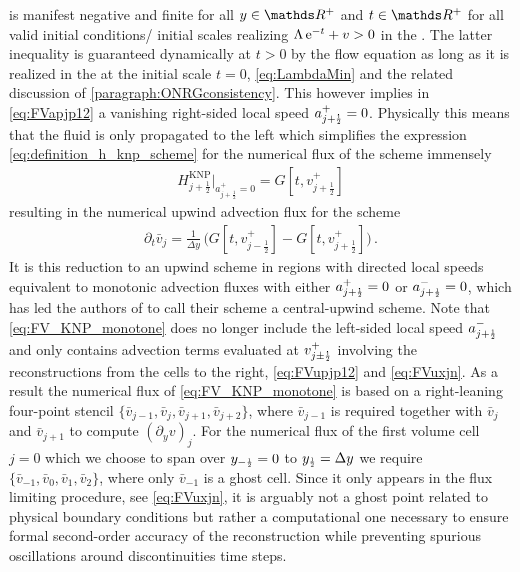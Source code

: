 is manifest negative and finite for all $y\in\Reals{}^+$ and $t\in\Reals{}^+$ for all valid initial conditions/\uv{} initial scales realizing $\Lambda \, \mathrm{e}^{-t} + v>0$ in the \uv{}.
The latter inequality is guaranteed dynamically at $t > 0$ by the flow equation as long as it is realized in the \uv{} at the initial scale $t = 0$, \cf{} \cref{eq:LambdaMin} and the related discussion of \rgcy{} \cref{paragraph:ONRGconsistency}.
This however implies in \cref{eq:FVapjp12} a vanishing right-sided local speed $a_{j + \ttfrac{1}{2}}^+=0$.
Physically this means that the fluid is only propagated to the left which simplifies the expression \eqref{eq:definition_h_knp_scheme} for the numerical flux of the \knp{} scheme immensely
\begin{align}
	H_{j + \frac{1}{2}}^{\mathrm{KNP}} \big|_{a_{j + \frac{1}{2}}^+ = 0} = G [ t, v_{j + \frac{1}{2}}^+ ]
\end{align}
resulting in the numerical upwind advection flux for the \knp{} scheme
\begin{align}
	\partial_t \bar{v}_j = \tfrac{1}{\Delta y} \, \big( G [ t, v_{j - \frac{1}{2}}^+] - G [ t, v_{j + \frac{1}{2}}^+ ] \big) \, .	\label{eq:FV_KNP_monotone}
\end{align}
It is this reduction to an upwind scheme in regions with directed local speeds equivalent to monotonic advection fluxes with either $a_{j + \ttfrac{1}{2}}^+ = 0$ or $a_{j + \ttfrac{1}{2}}^- = 0$, which has led the authors of  to call their scheme a central-upwind scheme.
Note that \cref{eq:FV_KNP_monotone} does no longer include the left-sided local speed $a_{j + \ttfrac{1}{2}}^-$ and only contains advection terms evaluated at $v_{j\pm\ttfrac{1}{2}}^+$ involving the reconstructions from the cells to the right, \cf{} \cref{eq:FVupjp12} and \eqref{eq:FVuxjn}.
As a result the numerical flux of \cref{eq:FV_KNP_monotone} is based on a right-leaning four-point stencil ${\{\bar{v}_{j-1},\bar{v}_j,\bar{v}_{j+1},\bar{v}_{j+2}\}}$, where $\bar{v}_{j-1}$ is required together with $\bar{v}_{j}$ and $\bar{v}_{j+1}$ to compute $( \partial_y v )_j$.
For the numerical flux of the first volume cell $j=0$ which we choose to span over $y_{-\ttfrac{1}{2}}=0$ to $y_{\ttfrac{1}{2}}=\Delta y$ we require ${\{\bar{v}_{-1},\bar{v}_0,\bar{v}_{1},\bar{v}_{2}\}}$, where only $\bar{v}_{-1}$ is a ghost cell.
Since it only appears in the flux limiting procedure, see \eqref{eq:FVuxjn}, it is arguably not a ghost point related to physical boundary conditions but rather a computational one necessary to ensure formal second-order accuracy of the \muscl{} reconstruction while preventing spurious oscillations around discontinuities \dash{} \tvd{} time steps. 

